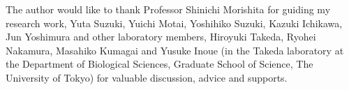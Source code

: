 The author would like to thank Professor Shinichi Morishita for guiding my research work, Yuta Suzuki, Yuichi Motai, Yoshihiko Suzuki, Kazuki Ichikawa, Jun Yoshimura and other laboratory members, Hiroyuki Takeda, Ryohei Nakamura, Masahiko Kumagai and Yusuke Inoue (in the Takeda laboratory at the Department of Biological Sciences, Graduate School of Science, The University of Tokyo) for valuable discussion, advice and supports.
